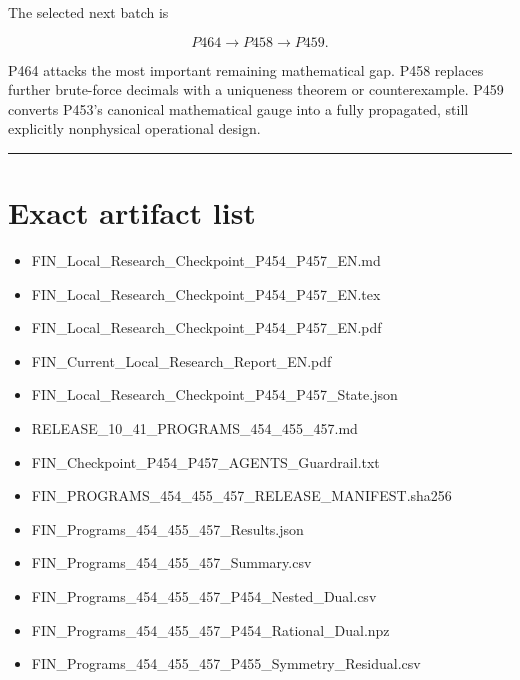 \documentclass[11pt,a4paper,openany]{report}
\begin{document}
The selected next batch is

\[
\boxed{P464\longrightarrow P458\longrightarrow P459}.
\]

P464 attacks the most important remaining mathematical gap. P458 replaces further brute-force decimals with a uniqueness theorem or counterexample. P459 converts P453's canonical mathematical gauge into a fully propagated, still explicitly nonphysical operational design.

\par\medskip\hrule\medskip

\chapter{Exact artifact list}

\begin{itemize}
\item 
FIN\_Local\_Research\_Checkpoint\_P454\_P457\_EN.md

\item 
FIN\_Local\_Research\_Checkpoint\_P454\_P457\_EN.tex

\item 
FIN\_Local\_Research\_Checkpoint\_P454\_P457\_EN.pdf

\item 
FIN\_Current\_Local\_Research\_Report\_EN.pdf

\item 
FIN\_Local\_Research\_Checkpoint\_P454\_P457\_State.json

\item 
RELEASE\_10\_41\_PROGRAMS\_454\_455\_457.md

\item 
FIN\_Checkpoint\_P454\_P457\_AGENTS\_Guardrail.txt

\item 
FIN\_PROGRAMS\_454\_455\_457\_RELEASE\_MANIFEST.sha256

\item 
FIN\_Programs\_454\_455\_457\_Results.json

\item 
FIN\_Programs\_454\_455\_457\_Summary.csv

\item 
FIN\_Programs\_454\_455\_457\_P454\_Nested\_Dual.csv

\item 
FIN\_Programs\_454\_455\_457\_P454\_Rational\_Dual.npz

\item 
FIN\_Programs\_454\_455\_457\_P455\_Symmetry\_Residual.csv


\end{itemize}
\end{document}
